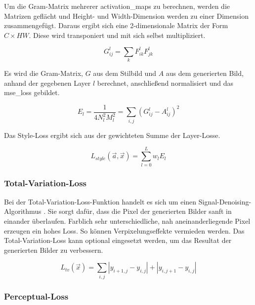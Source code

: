 Um die Gram-Matrix mehrerer \gls{activation_map}s zu berechnen, werden die Matrizen geflächt und Height- und Width-Dimension werden zu einer Dimension zusammengefügt. Daraus ergibt sich eine 2-dimensionale Matrix der Form $ C \times HW $. Diese wird transponiert und mit sich selbst multipliziert.

\begin{equation}
	\label{eq:gram_matrix_1}
	G_{ij}^{l} = \sum_{k} F_{ik}^{l} F_{jk}^{l}
\end{equation}

Es wird die Gram-Matrix, $ G $ aus dem Stilbild und $ A $ aus dem generierten Bild, anhand der gegebenen Layer $ l $ berechnet, anschließend normalisiert und das \gls{mse_loss} gebildet.

\begin{equation}
	\label{eq:gram_matrix_2}
	E_{l} = \frac{1}{4N_{l}^{2} M_{l}^2} = \sum_{i, j} ( G_{ij}^{l} - A_{ij}^{l} )^2
\end{equation}

Das Style-Loss ergibt sich aus der gewichteten Summe der Layer-Losse.

\begin{equation}
	\label{eq:style_loss}
	L_{style} ( \vec{a}, \vec{x} ) = \sum_{l=0}^{L} w_{l} E_{l}
\end{equation}

\subsubsection{Total-Variation-Loss}
\label{sec:total_variation_Loss}

Bei der Total-Variation-Loss-Funktion handelt es sich um einen Signal-Denoising-Algorithmus \cite{RUDIN1992259, DBLP:journals/corr/EstrelaMS16}. Sie sorgt dafür, dass die Pixel der generierten Bilder sanft in einander überlaufen. Farblich sehr unterschiedliche, nah aneinanderliegende Pixel erzeugen ein hohes Loss. So können Verpixelungseffekte vermieden werden. Das Total-Variation-Loss kann optional eingesetzt werden, um das Resultat der generierten Bilder zu verbessern.

\begin{equation}
	\label{eq:total_variation_loss}
	L_{tv} ( \vec{x} ) = \sum_{i,j} | y_{i + 1, j} - y_{i, j} | + | y_{i, j + 1} - y_{i,j} |
\end{equation}

\subsubsection{Perceptual-Loss}
\label{sec:perceptual_loss}

